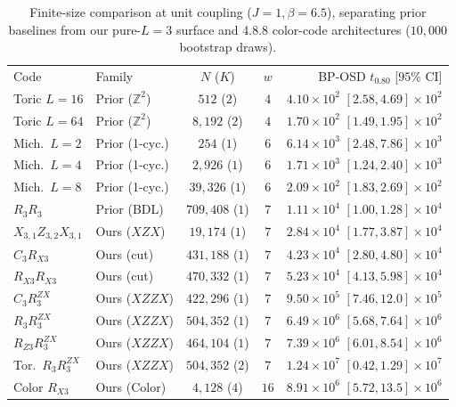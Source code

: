 \documentclass[aps,prx,reprint,superscriptaddress,nofootinbib,floatfix]{revtex4-2}
\begin{document}
\begin{table}[tbp]
\caption{Finite-size comparison at unit coupling ($J = 1, \beta = 6.5$), separating prior baselines from our pure-$L = 3$ surface and 4.8.8 color-code architectures ($10{,}000$ bootstrap draws).}
\label{tab:benchmarks}
{\scriptsize
\setlength{\tabcolsep}{0.2pt}
\begin{ruledtabular}
\begin{tabular}{llccr}
Code & Family & $N$ ($K$) & $w$ & BP-OSD $t_{0.80}$ [$95\%$ CI] \\
\colrule
Toric $L{=}16$ & Prior ($\mathbb{Z}^2$) & $512$ ($2$) & $4$ & $4.10{\times}10^2$ $[2.58, 4.69]{\times}10^2$ \\
Toric $L{=}64$ & Prior ($\mathbb{Z}^2$) & $8{,}192$ ($2$) & $4$ & $1.70{\times}10^2$ $[1.49, 1.95]{\times}10^2$ \\
Mich.\ $L{=}2$ & Prior (1-cyc.) & $254$ ($1$) & $6$ & $6.14{\times}10^3$ $[2.48, 7.86]{\times}10^3$ \\
Mich.\ $L{=}4$ & Prior (1-cyc.) & $2{,}926$ ($1$) & $6$ & $1.71{\times}10^3$ $[1.24, 2.40]{\times}10^3$ \\
Mich.\ $L{=}8$ & Prior (1-cyc.) & $39{,}326$ ($1$) & $6$ & $2.09{\times}10^2$ $[1.83, 2.69]{\times}10^2$ \\
$R_3 R_3$ & Prior (BDL) & $709{,}408$ ($1$) & $7$ & $1.11{\times}10^4$ $[1.00, 1.28]{\times}10^4$ \\
\colrule
$X_{3,1} Z_{3,2} X_{3,1}$ & Ours ($XZX$) & $19{,}174$ ($1$) & $7$ & $2.84{\times}10^4$ $[1.77, 3.87]{\times}10^4$ \\
$C_3 R_{X3}$ & Ours (cut) & $431{,}188$ ($1$) & $7$ & $4.23{\times}10^4$ $[2.80, 4.80]{\times}10^4$ \\
$R_{X3} R_{X3}$ & Ours (cut) & $470{,}332$ ($1$) & $7$ & $5.23{\times}10^4$ $[4.13, 5.98]{\times}10^4$ \\
$C_3 R_3^{ZX}$ & Ours ($XZZX$) & $422{,}296$ ($1$) & $7$ & $9.50{\times}10^5$ $[7.46, 12.0]{\times}10^5$ \\
$R_3 R_3^{ZX}$ & Ours ($XZZX$) & $504{,}352$ ($1$) & $7$ & $6.49{\times}10^6$ $[5.68, 7.64]{\times}10^6$ \\
$R_{Z3} R_3^{ZX}$ & Ours ($XZZX$) & $464{,}104$ ($1$) & $7$ & $7.39{\times}10^6$ $[6.01, 8.54]{\times}10^6$ \\
Tor.\ $R_3 R_3^{ZX}$ & Ours ($XZZX$) & $504{,}352$ ($2$) & $7$ & $1.24{\times}10^7$ $[0.42, 1.29]{\times}10^7$ \\
\colrule
Color $R_{X3}$ & Ours (Color) & $4{,}128$ ($4$) & $16$ & $8.91{\times}10^6$ $[5.72, 13.5]{\times}10^6$ \\

\end{tabular}
\end{ruledtabular}}
\end{table}
\end{document}
